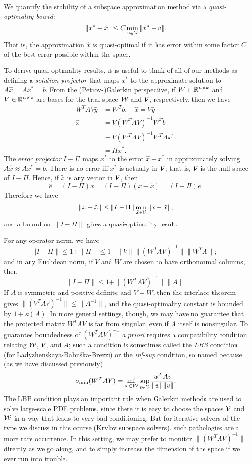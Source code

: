 \documentclass[12pt, leqno]{article} %
\begin{document}
We quantify the stability of a subspace approximation method via
a {\em quasi-optimality bound}:
\[
  \|x^*-\hat{x}\| \leq C \min_{v \in \mathcal{V}} \|x^*-v\|.
\]
That is, the approximation $\hat{x}$ is quasi-optimal if it has
error within some factor $C$ of the best error possible within the
space.

To derive quasi-optimality results, it is useful to think of all
of our methods as defining a {\em solution projector}
that maps $x^*$ to the approximate solution to $A\hat{x} = Ax^* = b$.
From the (Petrov-)Galerkin perspective, if $W \in \mathbb{R}^{n \times k}$
and $V \in \mathbb{R}^{n \times k}$ are bases for the trial space $\mathcal{W}$
and $\mathcal{V}$, respectively, then we have
\begin{align*}
  W^T A V \hat{y} &= W^T b, \quad \hat{x} = V \hat{y} \\
  \hat{x} &= V (W^T A V)^{-1} W^T b \\
          &= V (W^T A V)^{-1} W^T A x^*. \\
          &= \Pi x^*.
\end{align*}
The {\em error projector} $I-\Pi$ maps $x^*$ to the error $\hat{x}-x^*$
in approximately solving $A\hat{x} \approx Ax^* = b$.  There is no
error iff $x^*$ is actually in $\mathcal{V}$; that is, $\mathcal{V}$ is the
null space of $I-\Pi$.  Hence, if $\tilde{x}$ is any vector in $\mathcal{V}$,
then
\[
  \hat{e} = (I-\Pi) x = (I-\Pi) (x-\tilde{x}) = (I-\Pi) \tilde{e}.
\]
Therefore we have
\[
  \|x-\hat{x}\| \leq \|I-\Pi\| \min_{\tilde{x} \in \mathcal{V}} \|x-\tilde{x}\|,
\]
and a bound on $\|I-\Pi\|$ gives a quasi-optimality result.

For any operator norm, we have
\[
  |I-\Pi\| \leq 1+\|\Pi\| \leq 1 + \|V\| \|(W^T A V)^{-1}\| \|W^T A\|;
\]
and in any Euclidean norm, if $V$ and $W$ are chosen to have orthonormal
columns, then
\[
  \|I-\Pi\| \leq 1 + \|(W^T A V)^{-1}\| \|A\|.
\]
If $A$ is symmetric and positive definite and $V = W$, then the
interlace theorem gives $\|(V^T A V)^{-1}\| \leq \|A^{-1}\|$,
and the quasi-optimality constant is bounded by $1 + \kappa(A)$.
In more general settings, though, we may have no guarantee that
the projected matrix $W^T A V$ is far from singular, even if $A$
itself is nonsingular.  To guarantee boundedness of $(W^T A V)^{-1}$
{\em a priori} requires a compatibility condition relating
$\mathcal{W}$, $\mathcal{V}$, and $A$; such a condition is sometimes called
the {\em LBB} condition
(for Ladyzhenskaya-Babu\v{s}ka-Brezzi) or
the {\em inf-sup} condition, so named because (as we have discussed
previously)
\[
  \sigma_{\min}(W^T A V) =
  \inf_{w \in \mathcal{W}} \sup_{v \in \mathcal{V}} \frac{w^T A v}{\|w\| \|v\|}.
\]
The LBB condition plays an important role when Galerkin methods are
used to solve large-scale PDE problems, since there it is easy to
choose the spaces $\mathcal{V}$ and $\mathcal{W}$ in a way that leads to very
bad conditioning.  But for iterative solvers of the type we discuss
in this course (Krylov subspace solvers), such pathologies are a more
rare occurrence.  In this setting, we may prefer to
monitor $\|(W^T A V)^{-1}\|$ directly as we go along, and to simply
increase the dimension of the space if we ever run into trouble.
\end{document}
